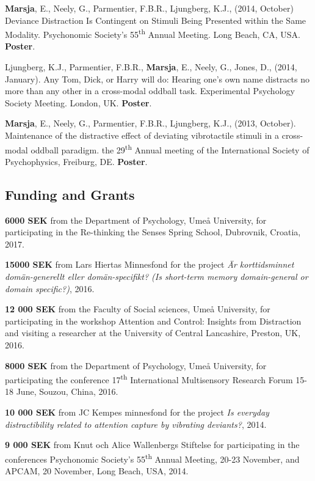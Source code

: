\documentclass[]{article}
\begin{document}
\textbf{Marsja}, E., Neely, G., Parmentier, F.B.R., Ljungberg, K.J.,
(2014, October) Deviance Distraction Is Contingent on Stimuli Being
Presented within the Same Modality. Psychonomic Society's
55\textsuperscript{th} Annual Meeting. Long Beach, CA, USA.
\textbf{Poster}.

Ljungberg, K.J., Parmentier, F.B.R., \textbf{Marsja}, E., Neely, G.,
Jones, D., (2014, January). Any Tom, Dick, or Harry will do: Hearing
one's own name distracts no more than any other in a cross-modal oddball
task. Experimental Psychology Society Meeting. London, UK.
\textbf{Poster}.

\textbf{Marsja}, E., Neely, G., Parmentier, F.B.R., Ljungberg, K.J.,
(2013, October). Maintenance of the distractive effect of deviating
vibrotactile stimuli in a cross-modal oddball paradigm. the
29\textsuperscript{th} Annual meeting of the International Society of
Psychophysics, Freiburg, DE. \textbf{Poster}.

\subsection{Funding and Grants}\label{funding-and-grants}

\textbf{6000 SEK} from the Department of Psychology, Umeå University,
for participating in the Re-thinking the Senses Spring School,
Dubrovnik, Croatia, 2017.

\textbf{15000 SEK} from Lars Hiertas Minnesfond for the project \emph{Är
korttidsminnet domän-generellt eller domän-specifikt? (Is short-term
memory domain-general or domain specific?)}, 2016.

\textbf{12 000 SEK} from the Faculty of Social sciences, Umeå
University, for participating in the workshop Attention and Control:
Insights from Distraction and visiting a researcher at the University of
Central Lancashire, Preston, UK, 2016.

\textbf{8000 SEK} from the Department of Psychology, Umeå University,
for participating the conference 17\textsuperscript{th} International
Multisensory Research Forum 15-18 June, Souzou, China, 2016.

\textbf{10 000 SEK} from JC Kempes minnesfond for the project \emph{Is
everyday distractibility related to attention capture by vibrating
deviants?}, 2014.

\textbf{9 000 SEK} from Knut och Alice Wallenbergs Stiftelse for
participating in the conferences Psychonomic Society's
55\textsuperscript{th} Annual Meeting, 20-23 November, and APCAM, 20
November, Long Beach, USA, 2014.
\end{document}
